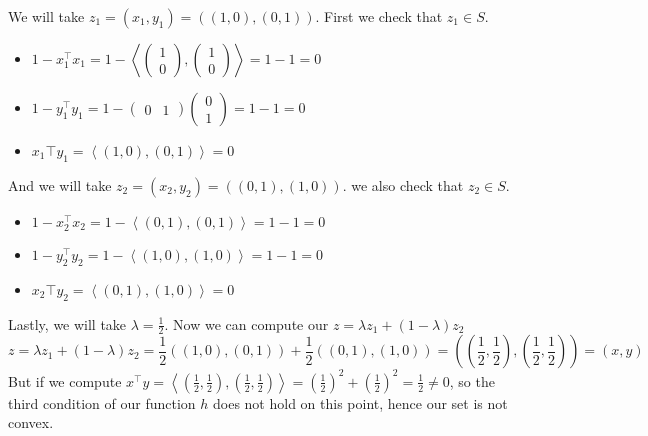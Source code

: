 \documentclass{article}
\begin{document}
\noindent We will take $z_1=(x_1,y_1)=((1,0),(0,1))$. First we check that $z_1 \in S$.
\begin{itemize}
\item $1-x_{1}^\top x_1=1-\left<\begin{pmatrix} 1\\ 0\end{pmatrix},\begin{pmatrix} 1\\ 0\end{pmatrix}\right>=1-1=0$
\item $1-y_{1}^\top y_1=1-\begin{pmatrix} 0& 1\end{pmatrix}\begin{pmatrix} 0\\ 1\end{pmatrix}=1-1=0$
\item $x_{1}\top y_1=\left<(1,0),(0,1)\right>=0$
\end{itemize}
And we will take $z_2=(x_2,y_2)=((0,1),(1,0))$. we also check that $z_2 \in S$.
\begin{itemize}
\item $1-x_{2}^\top x_2=1-\left<(0,1),(0,1)\right>=1-1=0$
\item $1-y_{2}^\top y_2=1-\left<(1,0),(1,0)\right>=1-1=0$
\item $x_{2}\top y_2=\left<(0,1),(1,0)\right>=0$
\end{itemize}
Lastly, we will take $\lambda=\frac{1}{2}$. Now we can compute our $z=\lambda z_1 + (1-\lambda) z_2$
$$z=\lambda z_1 + (1-\lambda) z_2=\frac{1}{2}((1,0),(0,1))+\frac{1}{2}((0,1),(1,0))=((\frac{1}{2},\frac{1}{2}),(\frac{1}{2},\frac{1}{2}))=(x,y)$$
But if we compute $x^\top y=\left< (\frac{1}{2},\frac{1}{2}),(\frac{1}{2},\frac{1}{2}) \right>=(\frac{1}{2})^2+(\frac{1}{2})^2=\frac{1}{2} \neq 0$, so the third condition of our function $h$ does not hold on this point, hence our set is not convex.\\
\end{document}

